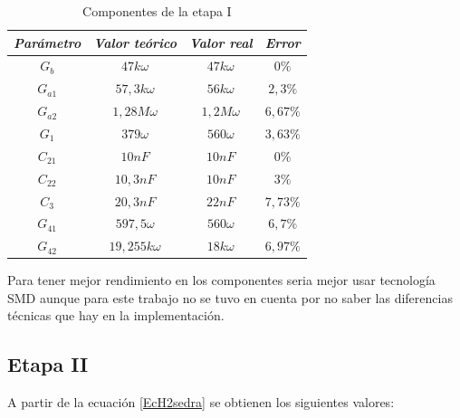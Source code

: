 \begin{table}[h]
\begin{tabular}{|c|c|c|c|}
\hline
\textit{\textbf{Parámetro}} & \textit{\textbf{Valor teórico}} & \textit{\textbf{Valor real}} & \textit{\textbf{Error}} \\ \hline
$G_b$                       & $47k\omega$                     & $47k \omega$                  & $0\%$                    \\ \hline
$G_{a1}$                    & $57,3k\omega$                   & $56k \omega$                  & $2,3\%$                  \\ \hline
$G_{a2}$                    & $1,28M\omega$                   & $1,2M \omega$                 & $6,67\%$                 \\ \hline
$G_1$                       & $379\omega$                     & $560\omega$                  & $3,63\%$                 \\ \hline
$C_{21}$                    & $10nF$                          & $10nF$                       & $0\%$                    \\ \hline
$C_{22}$                    & $10,3nF$                        & \textit{$10nF$}              & $3\%$                    \\ \hline
$C_3$                       & $20,3nF$                        & \textit{$22nF$}              & $7,73\%$                 \\ \hline
$G_{41}$                    & $597,5\omega$                   & $560\omega$                  & $6,7\%$                  \\ \hline
$G_{42}$                    & $19,255k\omega$                 & $18k\omega$                  & $6,97\%$                 \\ \hline
\end{tabular}
\centering
\caption{Componentes de la etapa I}
\end{table}


Para tener mejor rendimiento en los componentes seria mejor usar tecnología SMD aunque para este trabajo no se tuvo en cuenta por no saber las diferencias técnicas que hay en la implementación.




\subsection{Etapa II}

A partir de la ecuación \ref{EcH2sedra} se obtienen los siguientes valores:


